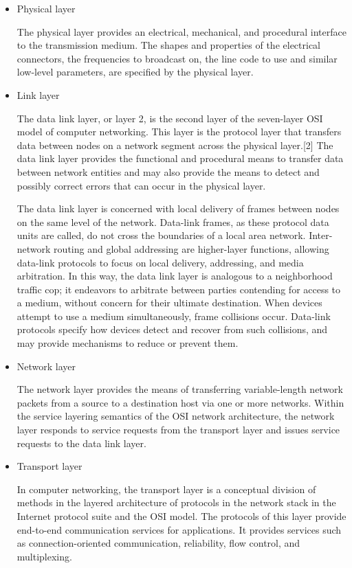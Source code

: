 \documentclass[10pt]{article}
\begin{document}
\begin{itemize}
    \item Physical layer
    
    The physical layer provides an electrical, mechanical, and procedural interface to the transmission medium. The shapes and properties of the electrical connectors, the frequencies to broadcast on, the line code to use and similar low-level parameters, are specified by the physical layer.
    \item Link layer
    
    The data link layer, or layer 2, is the second layer of the seven-layer OSI model of computer networking. This layer is the protocol layer that transfers data between nodes on a network segment across the physical layer.[2] The data link layer provides the functional and procedural means to transfer data between network entities and may also provide the means to detect and possibly correct errors that can occur in the physical layer.

The data link layer is concerned with local delivery of frames between nodes on the same level of the network. Data-link frames, as these protocol data units are called, do not cross the boundaries of a local area network. Inter-network routing and global addressing are higher-layer functions, allowing data-link protocols to focus on local delivery, addressing, and media arbitration. In this way, the data link layer is analogous to a neighborhood traffic cop; it endeavors to arbitrate between parties contending for access to a medium, without concern for their ultimate destination. When devices attempt to use a medium simultaneously, frame collisions occur. Data-link protocols specify how devices detect and recover from such collisions, and may provide mechanisms to reduce or prevent them.


\item Network layer

The network layer provides the means of transferring variable-length network packets from a source to a destination host via one or more networks. Within the service layering semantics of the OSI network architecture, the network layer responds to service requests from the transport layer and issues service requests to the data link layer.

    \item Transport layer
    

    In computer networking, the transport layer is a conceptual division of methods in the layered architecture of protocols in the network stack in the Internet protocol suite and the OSI model. The protocols of this layer provide end-to-end communication services for applications.  It provides services such as connection-oriented communication, reliability, flow control, and multiplexing.


\end{itemize}
\end{document}
